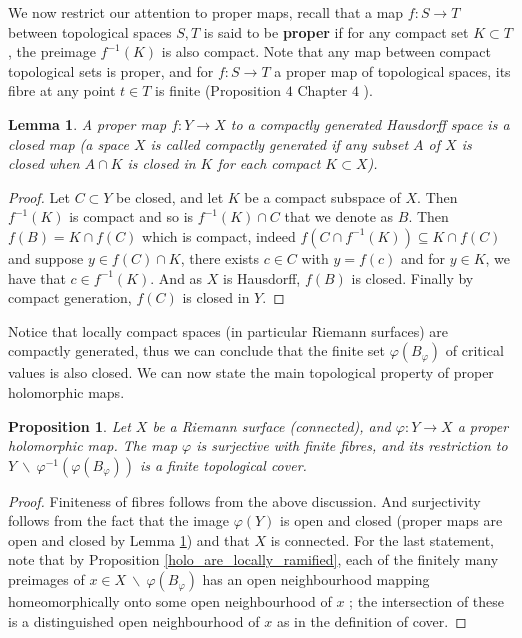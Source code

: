 \documentclass{article}
\theoremstyle{plain}
\newtheorem{proposition}[theorem]{Proposition}
\newtheorem{lemma}[theorem]{Lemma}
\theoremstyle{definition}
\begin{document}
\noindent We now restrict our attention to proper maps, recall that a map $f : S\rightarrow T$ between topological spaces $S,T$ is said to be \textbf{proper} if for any compact set $K\subset T$, the preimage $f^{-1}(K)$ is also compact.
Note that any map between compact topological sets is proper, and for $f:S\rightarrow T$ a proper map of topological spaces, its fibre at any point $t\in T$ is finite (Proposition $4$ Chapter $4$ \cite{Donaldson}).

\begin{lemma}
\label{proper_map_closed}
    A proper map $f:Y\rightarrow X$ to a compactly generated Hausdorff space is a closed map (a space $X$ is called \textit{compactly generated} if any subset $A$ of $X$ is closed when $A\cap K$ is closed in $K$ for each compact $K\subset X$).
\end{lemma}
\begin{proof}
    Let $C\subset Y$ be closed, and let $K$ be a compact subspace of $X$.
    Then $f^{-1}(K)$ is compact and so is $f^{-1}(K) \cap C$ that we denote as $B$.
    Then $f(B) = K\cap f(C)$ which is compact, 
    indeed $f(C\cap f^{-1}(K)) \subseteq K \cap f(C)$ and 
    suppose $y\in f(C)\cap K$, there exists $c\in C$ with $y= f(c)$ and for $y\in K$, we have that $c\in f^{-1}(K)$.
    And as $X$ is Hausdorff, $f(B)$ is closed. Finally by compact generation, $f(C)$ is closed in $Y$.
\end{proof}
\noindent Notice that locally compact spaces (in particular Riemann surfaces) are compactly generated, thus we can conclude that the finite set $\varphi(B_{\varphi})$ of critical values is also closed.
We can now state the main topological property of proper holomorphic maps.

\begin{proposition}
    Let $X$ be a Riemann surface (connected), and $\varphi:Y\rightarrow X$ a proper holomorphic map.
    The map $\varphi$ is surjective with finite fibres, and its restriction to $Y\:\backslash\:\varphi^{-1}(\varphi(B_{\varphi}))$ is a finite topological cover.
\end{proposition}
\begin{proof}
    Finiteness of fibres follows from the above discussion. And surjectivity follows from the fact that the image $\varphi(Y)$ is open and closed (proper maps are open and closed by Lemma \ref{proper_map_closed}) and that $X$ is connected.
    For the last statement, note that by Proposition \ref{holo_are_locally_ramified}, each of the finitely many preimages of $x\in X\:\backslash\: \varphi(B_{\varphi})$ has an open neighbourhood mapping homeomorphically onto some open neighbourhood of $x$ ; the intersection of these is a distinguished open neighbourhood of $x$ as in the definition of cover.
\end{proof}
\end{document}
